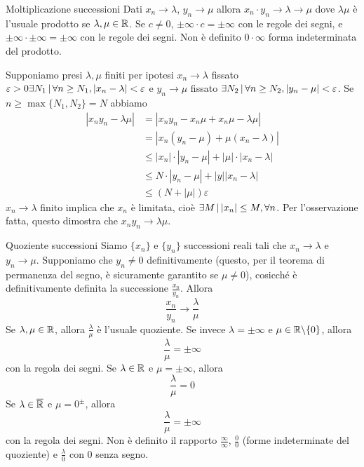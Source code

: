 \documentclass[a4paper]{article}
\begin{document}
\begin{snippetproposition}{Moltiplicazione successioni}
    Dati \(x_n \to \lambda\), \(y_n\to\mu\) allora \(x_n \cdot y_n \to \lambda \to \mu\)
    dove \(\lambda\mu\) è l'usuale prodotto se \(\lambda,\mu \in \mathbb{R}\).
    Se \(c\neq 0\), \(\pm\infty\cdot c = \pm \infty\) con le regole dei segni,
    e \(\pm\infty \cdot \pm\infty = \pm\infty\) con le regole dei segni.
    Non è definito \(0\cdot\infty\) forma indeterminata del prodotto.
\end{snippetproposition}

\begin{snippetproof}{}
    Supponiamo presi \(\lambda,\mu\) finiti per ipotesi \(x_n \to \lambda\)
    fissato \(\varepsilon > 0 \exists N_1 \,|\, \forall n\geq N_1, |x_n-\lambda| < \varepsilon\)
    e \(y_n \to \mu\) fissato \(\exists N_2 \,|\, \forall n\geq N_2, |y_n-\mu| < \varepsilon\).
    Se \(n \geq \max\{N_1, N_2\} = N\) abbiamo
    \begin{align*}
        |x_ny_n - \lambda\mu| &= |x_ny_n - x_n\mu + x_n\mu - \lambda\mu| \\
        &= |x_n(y_n-\mu) + \mu(x_n-\lambda)| \\
        &\leq |x_n| \cdot |y_n - \mu| + |\mu|\cdot|x_n - \lambda| \\
        &\leq N \cdot |y_n - \mu| + |y| |x_n - \lambda| \\
        &\leq (N + |\mu|)\varepsilon
    \end{align*}
    \(x_n\to\lambda\) finito implica che \(x_n\) è limitata, cioè \(\exists M \,|\, |x_n| \leq M, \forall n\).
    Per l'osservazione fatta, questo dimostra che \(x_ny_n \to \lambda\mu\).
\end{snippetproof}

\begin{snippetproposition}{Quoziente successioni}
    Siamo \(\{x_n\}\) e \(\{y_n\}\) successioni reali tali che \(x_n \to \lambda\) e \(y_n \to \mu\).
    Supponiamo che \(y_n \neq 0\) definitivamente (questo, per il teorema di permanenza del segno, è sicuramente
    garantito se \(\mu\neq 0\)), cosicché è definitivamente definita la successione \(\frac{x_n}{y_n}\).
    Allora
    \[
        \frac{x_n}{y_n} \to \frac{\lambda}{\mu}
    \]
    Se \(\lambda,\mu \in \mathbb{R}\), allora \(\frac{\lambda}{\mu}\) è l'usuale quoziente.
    Se invece \(\lambda = \pm\infty\) e \(\mu \in \mathbb{R} \backslash \{0\}\), allora
    \[
        \frac{\lambda}{\mu} = \pm \infty
    \]
    con la regola dei segni.
    Se \(\lambda\in\mathbb{R}\) e \(\mu = \pm\infty\), allora
    \[
        \frac{\lambda}{\mu} = 0
    \]
    Se \(\lambda \in \overline{\mathbb{R}}\) e \(\mu = 0^{\pm}\), allora
    \[
        \frac{\lambda}{\mu} = \pm\infty
    \]
    con la regola dei segni.
    Non è definito il rapporto \(\frac{\infty}{\infty}\), \(\frac{0}{0}\) (forme indeterminate del quoziente)
    e \(\frac{\lambda}{0}\) con \(0\) senza segno.
\end{snippetproposition}
\end{document}
